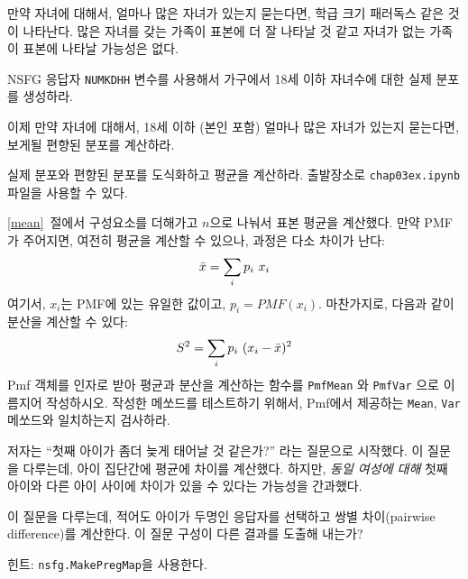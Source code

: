 \begin{exercise}
만약 자녀에 대해서, 얼마나 많은 자녀가 있는지 묻는다면, 학급 크기 패러독스 같은 것이 나타난다. 많은 자녀를 갖는 가족이 표본에 더 잘 나타날 것 같고 자녀가 없는 가족이
표본에 나타날 가능성은 없다.


NSFG 응답자 \verb"NUMKDHH" 변수를 사용해서 
가구에서 18세 이하 자녀수에 대한 실제 분포를 생성하라.

이제 만약 자녀에 대해서, 18세 이하 (본인 포함) 얼마나 많은 자녀가 있는지 묻는다면,
보게될 편향된 분포를 계산하라.

실제 분포와 편향된 분포를 도식화하고 평균을 계산하라. 
출발장소로 \verb"chap03ex.ipynb" 파일을 사용할 수 있다.
\end{exercise}


\begin{exercise}

\ref{mean}~절에서 구성요소를 더해가고 $n$으로 나눠서 표본 평균을 계산했다.
만약 PMF가 주어지면, 여전히 평균을 계산할 수 있으나, 과정은 다소 차이가 난다:
%
\[ \bar{x} = \sum_i p_i~x_i \]
%
여기서, $x_i$는 PMF에 있는 유일한 값이고, $p_i=PMF(x_i)$.
마찬가지로, 다음과 같이 분산을 계산할 수 있다:
%
\[ S^2 = \sum_i p_i~(x_i - \bar{x})^2\]
% 
Pmf 객체를 인자로 받아 평균과 분산을 계산하는 함수를 
{\tt PmfMean} 와 {\tt PmfVar} 으로 이름지어 작성하시오.
작성한 메쏘드를 테스트하기 위해서, Pmf에서 제공하는 
{\tt Mean}, {\tt Var} 메쏘드와 일치하는지 검사하라.

\end{exercise}


\begin{exercise}
저자는 ``첫째 아이가 좀더 늦게 태어날 것 같은가?'' 라는 질문으로 시작했다.
이 질문을 다루는데, 아이 집단간에 평균에 차이를 계산했다.
하지만, {\em 동일 여성에 대해} 첫째 아이와 다른 아이 사이에 차이가 있을 수 있다는 가능성을 간과했다.

이 질문을 다루는데, 적어도 아이가 두명인 응답자를 선택하고 
쌍별 차이(pairwise difference)를 계산한다.
이 질문 구성이 다른 결과를 도출해 내는가?

힌트: {\tt nsfg.MakePregMap}을 사용한다.
\end{exercise}


